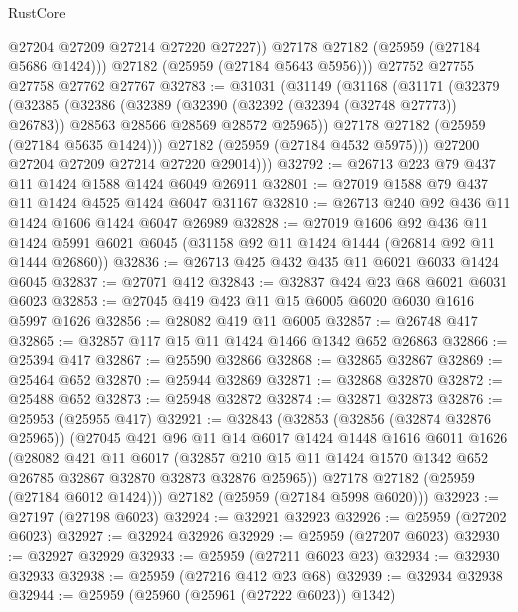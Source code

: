 \begin{lexlean}{RustCore}
\begin{coremodule}
            @27204
            @27209
            @27214
            @27220
            @27227))
        @27178
        @27182
        (@25959 (@27184 @5686 @1424)))
      @27182
      (@25959 (@27184 @5643 @5956)))
    @27752
    @27755
    @27758
    @27762
    @27767
@32783 := @31031
    (@31149
      (@31168
        (@31171
          (@32379
            (@32385
              (@32386
                (@32389
                  (@32390 (@32392 (@32394 (@32748 @27773)) @26783))
                  @28563
                  @28566
                  @28569
                  @28572
                  @25965))
              @27178
              @27182
              (@25959 (@27184 @5635 @1424)))
            @27182
            (@25959 (@27184 @4532 @5975)))
          @27200
          @27204
          @27209
          @27214
          @27220
          @29014)))
@32792 := @26713 @223 @79 @437 @11 @1424 @1588 @1424 @6049 @26911
@32801 := @27019 @1588 @79 @437 @11 @1424 @4525 @1424 @6047 @31167
@32810 := @26713 @240 @92 @436 @11 @1424 @1606 @1424 @6047 @26989
@32828 := @27019
    @1606
    @92
    @436
    @11
    @1424
    @5991
    @6021
    @6045
    (@31158 @92 @11 @1424 @1444 (@26814 @92 @11 @1444 @26860))
@32836 := @26713 @425 @432 @435 @11 @6021 @6033 @1424 @6045
@32837 := @27071 @412
@32843 := @32837 @424 @23 @68 @6021 @6031 @6023
@32853 := @27045 @419 @423 @11 @15 @6005 @6020 @6030 @1616 @5997 @1626
@32856 := @28082 @419 @11 @6005
@32857 := @26748 @417
@32865 := @32857 @117 @15 @11 @1424 @1466 @1342 @652 @26863
@32866 := @25394 @417
@32867 := @25590 @32866
@32868 := @32865 @32867
@32869 := @25464 @652
@32870 := @25944 @32869
@32871 := @32868 @32870
@32872 := @25488 @652
@32873 := @25948 @32872
@32874 := @32871 @32873
@32876 := @25953 (@25955 @417)
@32921 := @32843
    (@32853
      (@32856 (@32874 @32876 @25965))
      (@27045
        @421
        @96
        @11
        @14
        @6017
        @1424
        @1448
        @1616
        @6011
        @1626
        (@28082
          @421
          @11
          @6017
          (@32857 @210 @15 @11 @1424 @1570 @1342 @652 @26785 @32867 @32870 @32873 @32876 @25965))
        @27178
        @27182
        (@25959 (@27184 @6012 @1424)))
      @27182
      (@25959 (@27184 @5998 @6020)))
@32923 := @27197 (@27198 @6023)
@32924 := @32921 @32923
@32926 := @25959 (@27202 @6023)
@32927 := @32924 @32926
@32929 := @25959 (@27207 @6023)
@32930 := @32927 @32929
@32933 := @25959 (@27211 @6023 @23)
@32934 := @32930 @32933
@32938 := @25959 (@27216 @412 @23 @68)
@32939 := @32934 @32938
@32944 := @25959 (@25960 (@25961 (@27222 @6023)) @1342)

\end{coremodule}
\end{lexlean}
